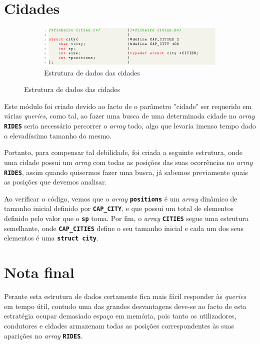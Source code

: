 \documentclass[12pt,a4paper]{report}
\begin{document}
\section{Cidades}

\begin{figure}[hbt!]
    \centering
    \begin{subfigure}{\textwidth}
        \centering
        \includegraphics[width=1\linewidth]{images/cities.png}
        \caption*{Estrutura de dados das cidades}
        \label{fig:cities}
    \end{subfigure}
\end{figure}

Este módulo foi criado devido ao facto de o parâmetro "cidade" ser requerido em várias \textit{queries}, como tal, ao fazer uma busca de uma determinada cidade no \textit{array} \textbf{\small\texttt{RIDES}} seria necessário percorrer o \textit{array} todo, algo que levaria imenso tempo dado o elevadíssimo  tamanho do mesmo.

Portanto, para compensar tal debilidade, foi criada a seguinte estrutura, onde uma cidade possui um \textit{array} com todas as posições das suas ocorrências no \textit{array} \textbf{\small\texttt{RIDES}}, assim quando quisermos fazer uma busca, já sabemos previamente quais as posições que devemos analisar.



Ao verificar o código, vemos que o \textit{array} \textbf{\small\texttt{positions}} é um \textit{array} dinâmico de tamanho inicial definido por \textbf{\small\texttt{CAP\_CITY}}, e que possui um total de elementos definido pelo valor que o \textbf{\small\texttt{sp}} toma. Por fim, o \textit{array} \textbf{\small\texttt{CITIES}}  segue uma estrutura semelhante, onde \textbf{\small\texttt{CAP\_CITIES}} define o seu tamanho inicial e cada um dos seus elementos é uma \textbf{\small\texttt{struct city}}.

\section{Nota final}

Perante esta estrutura de dados certamente fica mais fácil responder às \textit{queries} em tempo útil, contudo uma das grandes desvantagens deve-se ao facto de esta estratégia ocupar demasiado espaço em memória, pois tanto os utilizadores, condutores e cidades armazenam todas as posições correspondentes às suas aparições no \textit{array} \textbf{\small\texttt{RIDES}}.
\end{document}
